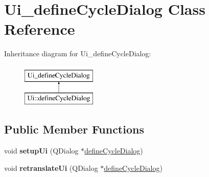 \hypertarget{class_ui__define_cycle_dialog}{}\section{Ui\+\_\+define\+Cycle\+Dialog Class Reference}
\label{class_ui__define_cycle_dialog}
Inheritance diagram for Ui\+\_\+define\+Cycle\+Dialog\+:\begin{figure}[H]
\begin{center}
\leavevmode
\includegraphics[height=2.000000cm]{class_ui__define_cycle_dialog}
\end{center}
\end{figure}
\subsection*{Public Member Functions}
\begin{DoxyCompactItemize}
\item 
\mbox{\label{class_ui__define_cycle_dialog_a023518fe6242d0a90494ecbb897dd9ac}} 
void {\bfseries setup\+Ui} (Q\+Dialog $\ast$\mbox{\hyperlink{classdefine_cycle_dialog}{define\+Cycle\+Dialog}})
\item 
\mbox{\label{class_ui__define_cycle_dialog_ab6b479d0332ab9a2e9ccc6ee3416bb97}} 
void {\bfseries retranslate\+Ui} (Q\+Dialog $\ast$\mbox{\hyperlink{classdefine_cycle_dialog}{define\+Cycle\+Dialog}})
\end{DoxyCompactItemize}
